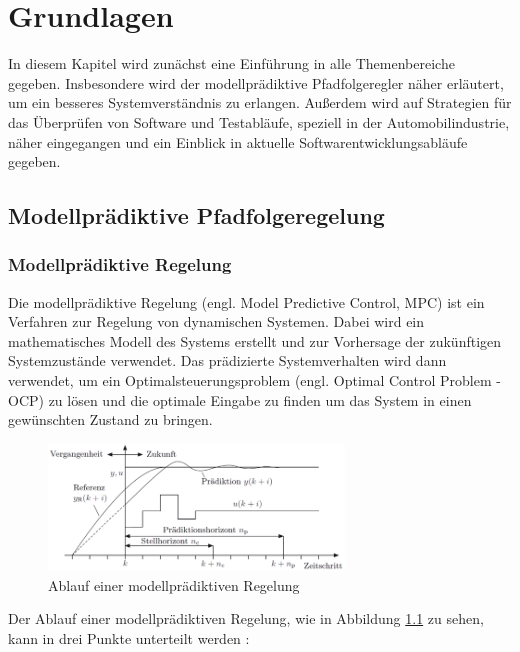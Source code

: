 \chapter{Grundlagen} \label{chap:Grundlagen}
\thispagestyle{empty}
In diesem Kapitel wird zunächst eine Einführung in alle Themenbereiche gegeben. Insbesondere wird der modellprädiktive Pfadfolgeregler näher erläutert, um ein besseres Systemverständnis zu erlangen. Außerdem wird auf  Strategien für das Überprüfen von Software und Testabläufe, speziell in der Automobilindustrie, näher eingegangen und ein Einblick in aktuelle Softwarentwicklungsabläufe gegeben. 
\section{Modellprädiktive Pfadfolgeregelung} \label{sec:MPFC}
\subsection{Modellprädiktive Regelung}
Die modellprädiktive Regelung (engl. Model Predictive Control, MPC) ist ein Verfahren zur Regelung von dynamischen Systemen. Dabei wird ein mathematisches Modell des Systems erstellt und zur Vorhersage der zukünftigen Systemzustände verwendet. Das prädizierte Systemverhalten wird dann verwendet, um ein Optimalsteuerungsproblem (engl. Optimal Control Problem - OCP) zu lösen und die optimale Eingabe zu finden um das System in einen gewünschten Zustand zu bringen.
\begin{figure}
    \centering
    \includegraphics[width=0.7\textwidth]{figures/2_Grundlagen/MPC_Diagramm.png}
    \caption{Ablauf einer modellprädiktiven Regelung \cite{adamy2014}}
    \label{fig:MPC}
\end{figure}
Der Ablauf einer modellprädiktiven Regelung, wie in Abbildung \ref{fig:MPC} zu sehen, kann in drei Punkte unterteilt werden \cite{camacho2013model}:
